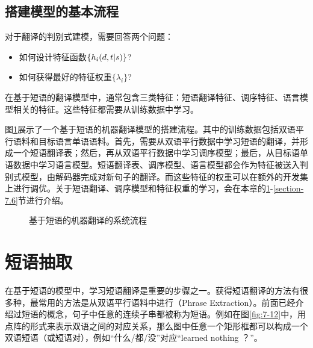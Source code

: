 \subsection{搭建模型的基本流程}

\parinterval 对于翻译的判别式建模，需要回答两个问题：

\begin{itemize}
\vspace{0.5em}
\item 如何设计特征函数$\{h_i(d,{t}|{s})\}$?
\vspace{0.5em}
\item 如何获得最好的特征权重$\{\lambda_i\}$?
\vspace{0.5em}
\end{itemize}

在基于短语的翻译模型中，通常包含三类特征：短语翻译特征、调序特征、语言模型相关的特征。这些特征都需要从训练数据中学习。

\parinterval 图\ref{fig:7-11}展示了一个基于短语的机器翻译模型的搭建流程。其中的训练数据包括双语平行语料和目标语言单语语料。首先，需要从双语平行数据中学习短语的翻译，并形成一个短语翻译表；然后，再从双语平行数据中学习调序模型；最后，从目标语单语数据中学习语言模型。短语翻译表、调序模型、语言模型都会作为特征被送入判别式模型，由解码器完成对新句子的翻译。而这些特征的权重可以在额外的开发集上进行调优。关于短语翻译、调序模型和特征权重的学习，会在本章的\ref{section-7.3}-\ref{section-7.6}节进行介绍。

\begin{figure}[htp]
\centering

\caption{基于短语的机器翻译的系统流程}
\label{fig:7-11}
\end{figure}


\sectionnewpage
\section{短语抽取}\label{section-7.3}

\parinterval 在基于短语的模型中，学习短语翻译是重要的步骤之一。获得短语翻译的方法有很多种，最常用的方法是从双语平行语料中进行{\small{}}（Phrase Extraction）。前面已经介绍过短语的概念，句子中任意的连续子串都被称为短语。例如在图\ref{fig:7-12}中，用点阵的形式来表示双语之间的对应关系，那么图中任意一个矩形框都可以构成一个双语短语（或短语对），例如“什么/都/没”对应“learned nothing ？”。

